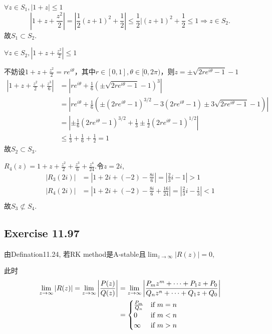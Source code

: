 \documentclass[UTF8]{ctexart}
\begin{document}
$\forall z \in S_1, |1 + z| \leq 1$
\begin{equation}
    |1 + z + \frac{z^2}{2}| = |\frac{1}{2}(z + 1)^2 + \frac{1}{2}| \leq \frac{1}{2}|(z+1)^2 + \frac{1}{2} \leq 1 \Rightarrow z\in S_2.
\end{equation}
故$S_1 \subset S_2$.

$\forall z \in S_2, |1 + z + \frac{z^2}{2}| \leq 1$

不妨设$1+z+\frac{z^2}{2} = re^{i\theta}$，其中$r\in [0,1], \theta\in [0,2\pi)$，则$z= \pm \sqrt{2re^{i\theta}-1}-1$
\begin{equation}
\begin{aligned}
    |1+z+\frac{z^2}{2}+\frac{z^3}{6}| &= |re^{i\theta} + \frac{1}{6}(\pm \sqrt{2re^{i\theta}-1}-1)^3 | \\
                                      &= |re^{i\theta} + \frac{1}{6}(\pm(2re^{i\theta}-1)^{3/2} - 3(2re^{i\theta}-1) \pm3\sqrt{2re^{i\theta}-1} -1) | \\
                                      &= |\pm \frac{1}{6}(2re^{i\theta}-1)^{3/2} + \frac{1}{3} \pm \frac{1}{2}(2re^{i\theta}-1)^{1/2} | \\
                                      &\leq \frac{1}{3} + \frac{1}{6} + \frac{1}{2} = 1
\end{aligned}
\end{equation}
故$S_2 \subset S_3$.

$R_4(z) = 1 + z + \frac{z^2}{2} + \frac{z^3}{6} + \frac{z^4}{24}$.令$z=2i$, 
\begin{equation}
\begin{aligned}
    |R_3(2i)| &= |1 + 2i + (-2) - \frac{8i}{6}| = |\frac{2}{3}i - 1| > 1 \\
    |R_4(2i)| &= |1 + 2i + (-2) - \frac{8i}{6} + \frac{16}{24}| = |\frac{2}{3}i - \frac{1}{3}| < 1 \\
\end{aligned}
\end{equation}
故$S_3 \not\subset S_4$.

\subsection*{Exercise 11.97}
由Defination11.24, 若RK method是A-stable且$\lim_{z \to \infty} |R(z)| = 0$,

此时
\begin{equation}
\begin{aligned}
    \lim_{z \to \infty} |R(z)| = \lim_{z \to \infty} \left|\frac{P(z)}{Q(z)}\right| 
    &= \lim_{z \to \infty} \left|\frac{P_m z^m + \cdots + P_1 z + P_0}{Q_n z^n + \cdots + Q_1 z + Q_0}\right| \\
    &= \begin{cases}
            \frac{P_m}{Q_n} & $if $ m=n \\
            0 & $if $ m<n \\
            \infty & $if $ m>n
        \end{cases}
\end{aligned}
\end{equation}
    
\end{document}
